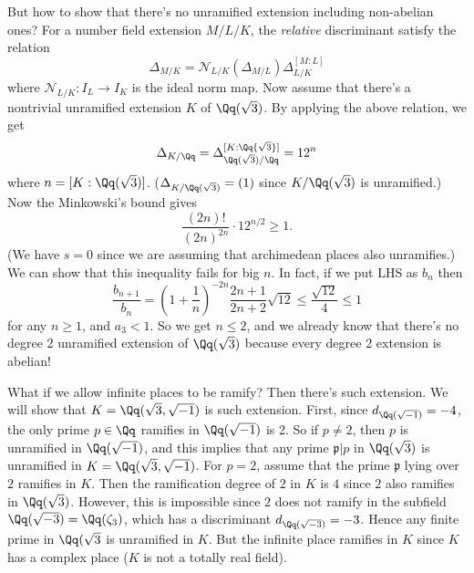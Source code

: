 \documentclass{article}
\begin{document}
But how to show that there's no unramified extension including non-abelian ones? 
For a number field extension $M/L/K$, the \emph{relative} discriminant satisfy the relation 
$$
\Delta_{M/K} = \mathcal{N}_{L/K}(\Delta_{M/L}) \Delta_{L/K}^{[M:L]}
$$
where $\mathcal{N}_{L/K}:I_{L}\to I_{K}$ is the ideal norm map. 
Now assume that there's a nontrivial unramified extension $K$ of $\Qq(\sqrt{3})$. By applying the above relation, we get
$$
\Delta_{K/\Qq} = \Delta_{\Qq(\sqrt{3})/\Qq}^{[K:\Qq{\sqrt{3}}]} = 12^{n}
$$
where $n = [K:\Qq(\sqrt{3})]$. 
($\Delta_{K/\Qq(\sqrt{3})} = (1)$ since $K/\Qq(\sqrt{3})$ is unramified.) 
Now the Minkowski's bound gives
$$
\frac{(2n)!}{(2n)^{2n}} \cdot 12^{n/2} \geq 1.
$$
(We have $s = 0$ since we are assuming that archimedean places also unramifies.) 
We can show that this inequality fails for big $n$. 
In fact, if we put LHS as $b_{n}$ then 
$$
\frac{b_{n+1}}{b_{n}} = \left( 1 + \frac{1}{n}\right)^{-2n} \frac{2n+1}{2n+2} \sqrt{12} \leq \frac{\sqrt{12}}{4} \leq 1
$$
for any $n\geq 1$, and $a_{3} < 1$. 
So we get $n \leq 2$, and we already know that there's no degree 2 unramified extension of $\Qq(\sqrt{3})$ because every degree 2 extension is abelian!

What if we allow infinite places to be ramify? 
Then there's such extension. 
We will show that $K = \Qq(\sqrt{3}, \sqrt{-1})$ is such extension. 
First, since $d_{\Qq(\sqrt{-1})} = -4$, the only prime $p\in \Qq$ ramifies in $\Qq(\sqrt{-1})$ is 2. 
So if $p\neq 2$, then $p$ is unramified in $\Qq(\sqrt{-1})$, and this implies that any prime $\mathfrak{p}|p$ in $\Qq(\sqrt{3})$ is unramified in $K = \Qq(\sqrt{3}, \sqrt{-1})$. 
For $p = 2$, assume that the prime $\mathfrak{p}$  lying over $2$ ramifies in $K$. 
Then the ramification degree of $2$ in $K$ is $4$ since $2$ also ramifies in $\Qq(\sqrt{3})$. 
However, this is impossible since $2$ does not ramify in the subfield $\Qq(\sqrt{-3}) = \Qq(\zeta_{3})$, which has a discriminant $d_{\Qq(\sqrt{-3})} = -3$. 
Hence any finite prime in $\Qq(\sqrt{3}$ is unramified in $K$. But the infinite place ramifies in $K$ since $K$ has a complex place ($K$ is not a totally real field). 
\end{document}
